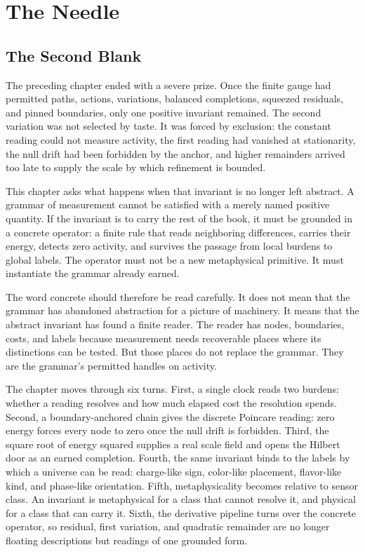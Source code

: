 \chapter{The Needle}
\label{chap:concrete-operator-metaphysical-relativity}

\section{The Second Blank}

The preceding chapter ended with a severe prize. Once the finite gauge had
permitted paths, actions, variations, balanced completions, squeezed
residuals, and pinned boundaries, only one positive invariant remained. The
second variation was not selected by taste. It was forced by exclusion: the
constant reading could not measure activity, the first reading had vanished
at stationarity, the null drift had been forbidden by the anchor, and higher
remainders arrived too late to supply the scale by which refinement is
bounded.

This chapter asks what happens when that invariant is no longer left
abstract. A grammar of measurement cannot be satisfied with a merely named
positive quantity. If the invariant is to carry the rest of the book, it must
be grounded in a concrete operator: a finite rule that reads neighboring
differences, carries their energy, detects zero activity, and survives the
passage from local burdens to global labels. The operator must not be a new
metaphysical primitive. It must instantiate the grammar already earned.

The word concrete should therefore be read carefully. It does not mean that
the grammar has abandoned abstraction for a picture of machinery. It means
that the abstract invariant has found a finite reader. The reader has nodes,
boundaries, costs, and labels because measurement needs recoverable places
where its distinctions can be tested. But those places do not replace the
grammar. They are the grammar's permitted handles on activity.

The chapter moves through six turns. First, a single clock reads two burdens:
whether a reading resolves and how much elapsed cost the resolution spends.
Second, a boundary-anchored chain gives the discrete Poincare reading: zero
energy forces every node to zero once the null drift is forbidden. Third,
the square root of energy squared supplies a real scale field and opens the
Hilbert door as an earned completion. Fourth, the same invariant binds to
the labels by which a universe can be read: charge-like sign, color-like
placement, flavor-like kind, and phase-like orientation. Fifth,
metaphysicality becomes relative to sensor class. An invariant is
metaphysical for a class that cannot resolve it, and physical for a class
that can carry it. Sixth, the derivative pipeline turns over the concrete
operator, so residual, first variation, and quadratic remainder are no
longer floating descriptions but readings of one grounded form.

